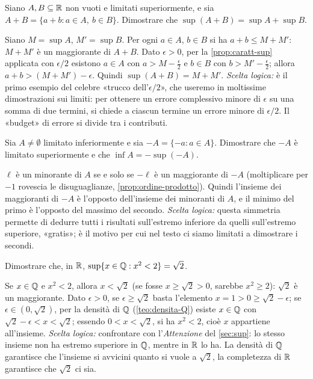 \begin{esercizio}\label{es:sup-somma}
Siano $A,B\subseteq\mathbb{R}$ non vuoti e limitati superiormente, e sia
$A+B=\{a+b : a\in A,\ b\in B\}$. Dimostrare che $\sup(A+B)=\sup A+\sup B$.
\begin{soluzione}
Siano $M=\sup A$, $M'=\sup B$. Per ogni $a\in A$, $b\in B$ si ha $a+b\le M+M'$: $M+M'$ è
un maggiorante di $A+B$. Dato $\epsilon>0$, per la \cref{prop:caratt-sup} applicata con
$\epsilon/2$ esistono $a\in A$ con $a>M-\frac\epsilon2$ e $b\in B$ con
$b>M'-\frac\epsilon2$; allora $a+b>(M+M')-\epsilon$. Quindi $\sup(A+B)=M+M'$.
\emph{Scelta logica:} è il primo esempio del celebre «trucco dell'$\epsilon/2$», che
useremo in moltissime dimostrazioni sui limiti: per ottenere un errore complessivo
minore di $\epsilon$ su una somma di due termini, si chiede a ciascun termine un errore
minore di $\epsilon/2$. Il «budget» di errore si divide tra i contributi.
\end{soluzione}
\end{esercizio}

\begin{esercizio}
Sia $A\neq\emptyset$ limitato inferiormente e sia $-A=\{-a : a\in A\}$. Dimostrare che
$-A$ è limitato superiormente e che $\inf A=-\sup(-A)$.
\begin{soluzione}
$\ell$ è un minorante di $A$ se e solo se $-\ell$ è un maggiorante di $-A$ (moltiplicare
per $-1$ rovescia le disuguaglianze, \cref{prop:ordine-prodotto}). Quindi l'insieme dei
maggioranti di $-A$ è l'opposto dell'insieme dei minoranti di $A$, e il minimo del primo
è l'opposto del massimo del secondo. \emph{Scelta logica:} questa simmetria permette di
dedurre tutti i risultati sull'estremo inferiore da quelli sull'estremo superiore,
«gratis»; è il motivo per cui nel testo ci siamo limitati a dimostrare i secondi.
\end{soluzione}
\end{esercizio}

\begin{esercizio}\label{es:sup-razionali}
Dimostrare che, in $\mathbb{R}$, $\sup\{x\in\mathbb{Q} : x^{2}<2\}=\sqrt2$.
\begin{soluzione}
Se $x\in\mathbb{Q}$ e $x^{2}<2$, allora $x<\sqrt2$ (se fosse $x\ge\sqrt2>0$, sarebbe
$x^{2}\ge2$): $\sqrt2$ è un maggiorante. Dato $\epsilon>0$, se $\epsilon\ge\sqrt2$ basta
l'elemento $x=1>0\ge\sqrt2-\epsilon$; se $\epsilon\in(0,\sqrt2)$, per la densità di
$\mathbb{Q}$ (\cref{teo:densita-Q}) esiste $x\in\mathbb{Q}$ con $\sqrt2-\epsilon<x<\sqrt2$; essendo
$0<x<\sqrt2$, si ha $x^{2}<2$, cioè $x$ appartiene all'insieme. \emph{Scelta logica:}
confrontare con l'\emph{Attenzione} del \cref{sec:sup}: lo stesso insieme non ha estremo
superiore in $\mathbb{Q}$, mentre in $\mathbb{R}$ lo ha. La densità di $\mathbb{Q}$ garantisce che l'insieme si
avvicini quanto si vuole a $\sqrt2$, la completezza di $\mathbb{R}$ garantisce che $\sqrt2$ ci sia.
\end{soluzione}
\end{esercizio}

